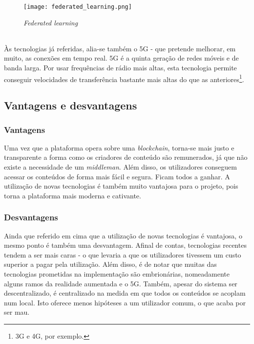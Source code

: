 \documentclass{llncs}
\begin{document}
\begin{figure}
    \centering
    \texttt{[image: federated\_learning.png]}
    \caption{\emph{Federated learning}} \cite{federated_learning}
\end{figure}
\\
\noindent Às tecnologias já referidas, alia-se também o 5G - que pretende melhorar, em muito, as conexões em tempo real. 5G é a quinta geração de redes móveis e de banda larga. Por usar frequências de rádio mais altas, esta tecnologia permite conseguir velocidades de transferência bastante mais altas do que as anteriores\footnote{3G e 4G, por exemplo.}.

\subsection{Vantagens e desvantagens}

\subsubsection{Vantagens}
Uma vez que a plataforma opera sobre uma \emph{blockchain}, torna-se mais justo e transparente a forma como os criadores de conteúdo são remunerados, já que não existe a necessidade de um \emph{middleman}. Além disso, os utilizadores conseguem acessar os conteúdos de forma mais fácil e segura. Ficam todos a ganhar. A utilização de novas tecnologias é também muito vantajosa para o projeto, pois torna a plataforma mais moderna e cativante.

\subsubsection{Desvantagens}
Ainda que referido em cima que a utilização de novas tecnologias é vantajosa, o mesmo ponto é também uma desvantagem. Afinal de contas, tecnologias recentes tendem a ser mais caras - o que levaria a que os utilizadores tivessem um custo superior a pagar pela utilização. Além disso, é de notar que muitas das tecnologias prometidas na implementação são embrionárias, nomeadamente alguns ramos da realidade aumentada e o 5G. Também, apesar do sistema ser descentralizado, é centralizado na medida em que todos os conteúdos se acoplam num local. Isto oferece menos hipóteses a um utilizador comum, o que acaba por ser mau.
\end{document}
